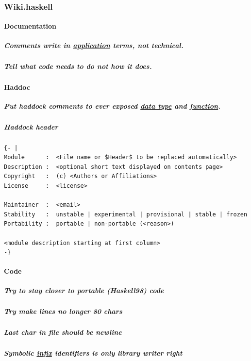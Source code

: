 \documentclass[11pt]{article}
\begin{document}
\subsubsection{Wiki.haskell}
\label{sec:org6cb1ce2}

\paragraph{Documentation}
\label{sec:org322aaf6}

\subparagraph{Comments write in \hyperref[org2b89e66]{application} terms, not technical.}
\label{sec:org830284e}

\subparagraph{Tell what code needs to do not how it does.}
\label{sec:org543a92f}

\paragraph{Haddoc}
\label{sec:orgfca76a0}

\subparagraph{Put haddock comments to ever exposed \hyperref[org212d9c3]{data type} and \hyperref[orge15bc14]{function}.}
\label{sec:org3281825}

\subparagraph{Haddock header}
\label{sec:org61d35e7}
\begin{verbatim}
{- |
Module      :  <File name or $Header$ to be replaced automatically>
Description :  <optional short text displayed on contents page>
Copyright   :  (c) <Authors or Affiliations>
License     :  <license>

Maintainer  :  <email>
Stability   :  unstable | experimental | provisional | stable | frozen
Portability :  portable | non-portable (<reason>)

<module description starting at first column>
-}
\end{verbatim}

\paragraph{Code}
\label{sec:org440f369}

\subparagraph{Try to stay closer to portable (Haskell98) code}
\label{sec:orgbf4599d}

\subparagraph{Try make lines no longer 80 chars}
\label{sec:org717f072}

\subparagraph{Last char in file should be newline}
\label{sec:org8519138}

\subparagraph{Symbolic \hyperref[org3c7984a]{infix} identifiers is only library writer right}
\label{sec:org78952a0}
\end{document}
